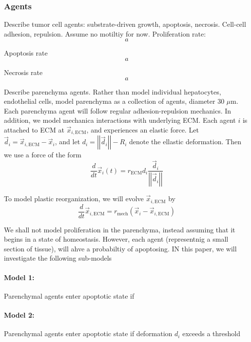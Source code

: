 \documentclass[smallextended,natbib,draft]{svjour3}
\newcommand{\beq}{\begin{equation}}
\newcommand{\eeq}{\end{equation}}
\newcommand{\micron}{\mu\textrm{m}}
\newcommand{\norm}[1]{\left|\left|#1\right|\right|}
\begin{document}
\subsubsection{Agents}
Describe tumor cell agents: substrate-driven growth, apoptosis, necrosis. Cell-cell adhesion, repulsion. Assume no 
motiltiy for now. Proliferation rate: 
\beq
a
\eeq

Apoptosis rate
\beq
a
\eeq

Necrosis rate
\beq
a
\eeq

Describe parenchyma agents. Rather than model individual hepatocytes, endothelial cells, model parenchyma as a collection 
of agents, diameter 30 $\micron$. Each parenchyma agent will follow regular adhesion-repulsion mechanics. In addition, we model 
mechanica interactions with underlying ECM. Each agent $i$ is attached to ECM at $\vec{x}_{i,\textrm{ECM}}$, and experiences 
an elastic force. Let $\vec{d}_i = \vec{x}_{i,\textrm{ECM}} - \vec{x}_i $, and let $d_i = \norm{ \vec{d}_i } - R_i$ denote 
the ellastic deformation. Then we use a force of the form 
\beq
\frac{d}{dt} \vec{x}_{i}(t) =r_\textrm{ECM} d_i  \frac{ \vec{d}_i }{ \norm{\vec{d}_i}} 
\eeq

To model plastic reorganization, we will evolve $\vec{x}_{i,\textrm{ECM}}$ by 
\beq
\frac{d}{dt} \vec{x}_{i,\textrm{ECM}} = r_\textrm{mech} \left( \vec{x}_{i} - \vec{x}_{i,\textrm{ECM}} \right)
\eeq

We shall not model proliferation in the parenchyma, instead assuming that it begins in a state of homeostasis. 
However, each agent (representnig a small section of tissue), will ahve a probabiltiy of apoptosing. 
IN this paper, we will investigate the following sub-models 

\paragraph{Model 1:} Parenchymal agents enter apoptotic state if 

\paragraph{Model 2:} Parenchymal agents enter apoptotic state if deformation $d_i$ exceeds a threshold 
\end{document}
